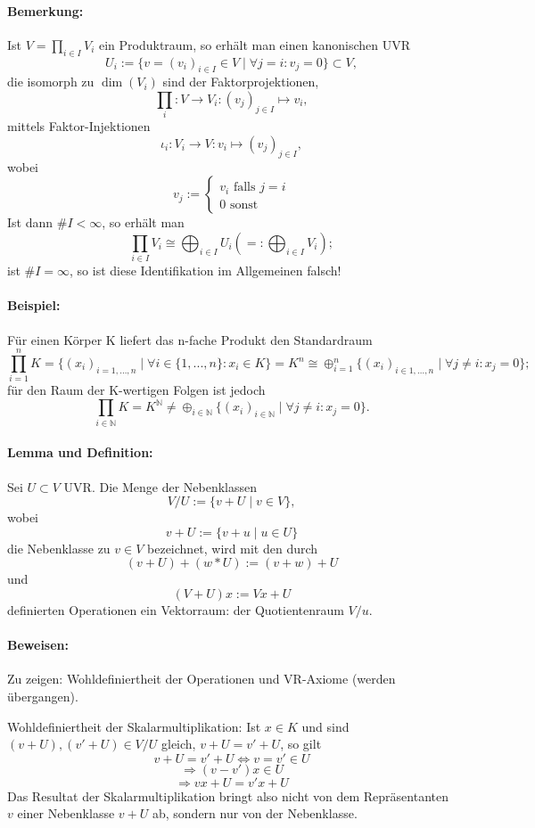 \paragraph{Bemerkung: } 
		Ist $V = \prod_{i\in I} V_i$ ein Produktraum, so erhält man einen kanonischen UVR
			\[U_i:=\{v=(v_i)_{i\in I}\in V\mid\forall j = i:v_j = 0\}\subset V,\]
		die isomorph zu $\dim(V_i)$ sind der Faktorprojektionen,
			\[\prod_i:V\to V_i:(v_j)_{j\in I} \mapsto v_i,\]
		mittels Faktor-Injektionen
			\[\iota_i:V_i\to V: v_i \mapsto(v_j)_{j\in I},\]
		wobei
			\[v_j :=
				\begin{cases}
					v_i \text{ falls } j=i\\
					0 \text{ sonst}
				\end{cases}
			\]
		Ist dann $\# I < \infty$, so erhält man
			\[\prod_{i\in I} V_i\cong \bigoplus_{i\in I}U_i (=: \bigoplus_{i\in I}V_i);\]
		ist $\#I=\infty$, so ist diese Identifikation im Allgemeinen falsch!
	
\paragraph{Beispiel: }
	Für einen Körper K liefert das n-fache Produkt den Standardraum
		\[\prod_{i=1}^{n}K = \{(x_i)_{i = 1,...,n}\mid\forall i \in \{1,...,n\}: x_i \in K\} = K^n \cong \oplus_{i=1}^n\{(x_i)_{i\in {1,...,n}}\mid\forall j\neq i: x_j = 0\};\]
	für den Raum der K-wertigen Folgen ist jedoch
		\[\prod_{i\in \mathbb{N}}K=K^{\mathbb{N}}\neq\oplus_{i\in \mathbb{N}}\{(x_i)_{i\in \mathbb{N}}\mid\forall j\neq i: x_j=0\}.\]
			
\paragraph{Lemma und Definition: }
	Sei $U\subset V$ UVR. Die Menge der Nebenklassen 
		\[V/U := \{v+U\mid v\in V\},\]
	wobei
		\[v+U:=\{v+u\mid u\in U\}\]
	die Nebenklasse zu $v\in V$ bezeichnet, wird mit den durch
		\[(v+U)+(w*U):=(v+w)+U\]
	und
		\[(V+U)x := Vx + U\]
	definierten Operationen ein Vektorraum: der Quotientenraum $V/u$.
			
\paragraph{Beweisen: }
	Zu zeigen: Wohldefiniertheit der Operationen und VR-Axiome (werden übergangen).
	
	Wohldefiniertheit der Skalarmultiplikation: Ist $x\in K$ und sind $(v+U),(v'+U)\in V/U$ gleich, $v+U = v' + U$, so gilt
		\[v+U = v'+U \Leftrightarrow v = v'\in U\] \[\Rightarrow (v-v')x \in U\]
		\[\Rightarrow vx+U=v' x+U\]
	Das Resultat der Skalarmultiplikation bringt also nicht von dem Repräsentanten $v$ einer Nebenklasse $v+U$ ab, sondern nur von der Nebenklasse.
	
